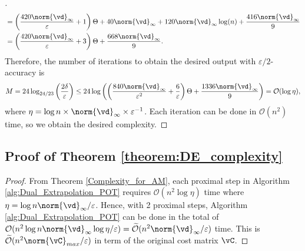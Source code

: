 \begin{proof} [\unskip\nopunct]
\begin{align*}
        &= \left( \frac{420 \norm{\vd}_\infty}{\varepsilon} + 1 \right) \Theta + 40 \norm{\vd}_\infty + 120\norm{\vd}_\infty \log(n) + \frac{416 \norm{\vd}_\infty}{9} \\
        &= \left( \frac{420 \norm{\vd}_\infty}{\varepsilon} + 3 \right) \Theta + \frac{668 \norm{\vd}_\infty}{9}. 
    \end{align*}
    Therefore, the number of iterations to obtain the desired output with $\varepsilon/2$-accuracy is 
    \begin{equation*}
        M = 24 \log_{24/23} \left( \frac{2 \delta}{\varepsilon} \right) \leq 24 \log \left( \left( \frac{840 \norm{\vd}_\infty}{\varepsilon^2} + \frac{6}{\varepsilon} \right) \Theta + \frac{1336 \norm{\vd}_\infty}{9} \right) = \mathcal{O} (\log \eta),
        \end{equation*}
    where $\eta = \log n \times \norm{\vd}_\infty \times \varepsilon^{-1}$. Each iteration can be done in $\mathcal{O} (n^2)$ time, so we obtain the desired complexity.
\end{proof}

\subsection{Proof of Theorem \ref{theorem:DE_complexity}}
\begin{proof}
        \label{proof:Complexity_for_AM}
        From Theorem \ref{Complexity_for_AM}, each proximal step in Algorithm \ref{alg:Dual_Extrapolation_POT} requires $\mathcal{O}(n^2 \log \eta)$ time where $\eta = \log n \norm{\vd}_\infty / \varepsilon$. Hence, with 2 proximal steps, Algorithm \ref{alg:Dual_Extrapolation_POT} can be done in the total of $\mathcal{O}(n^2 \log n \norm{\vd}_\infty \log \eta / \varepsilon) = \mathcal{\widetilde O}(n^2 \norm{\vd}_\infty / \varepsilon)$ time. This is $\mathcal{\widetilde O}(n^2 \norm{\vC}_{max} / \varepsilon)$ in term of the original cost matrix $\vC$.
\end{proof}


